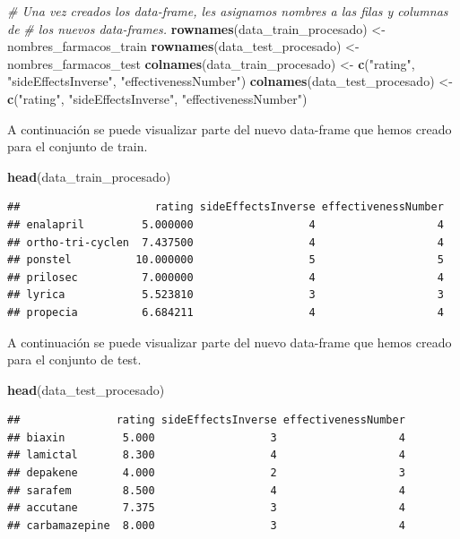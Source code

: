 \documentclass[spanish,]{article}
\newenvironment{Shaded}{\begin{snugshade}}{\end{snugshade}}
\newcommand{\KeywordTok}[1]{\textcolor[rgb]{0.13,0.29,0.53}{\textbf{#1}}}
\newcommand{\StringTok}[1]{\textcolor[rgb]{0.31,0.60,0.02}{#1}}
\newcommand{\CommentTok}[1]{\textcolor[rgb]{0.56,0.35,0.01}{\textit{#1}}}
\newcommand{\NormalTok}[1]{#1}
\begin{document}
\begin{Shaded}
\begin{Highlighting}[]
\CommentTok{# Una vez creados los data-frame, les asignamos nombres a las filas y columnas de }
\CommentTok{# los nuevos data-frames.}
\KeywordTok{rownames}\NormalTok{(data_train_procesado) <-}\StringTok{ }\NormalTok{nombres_farmacos_train}
\KeywordTok{rownames}\NormalTok{(data_test_procesado) <-}\StringTok{ }\NormalTok{nombres_farmacos_test}
\KeywordTok{colnames}\NormalTok{(data_train_procesado) <-}\StringTok{ }\KeywordTok{c}\NormalTok{(}\StringTok{"rating"}\NormalTok{, }\StringTok{"sideEffectsInverse"}\NormalTok{, }\StringTok{"effectivenessNumber"}\NormalTok{)}
\KeywordTok{colnames}\NormalTok{(data_test_procesado) <-}\StringTok{ }\KeywordTok{c}\NormalTok{(}\StringTok{"rating"}\NormalTok{, }\StringTok{"sideEffectsInverse"}\NormalTok{, }\StringTok{"effectivenessNumber"}\NormalTok{)}
\end{Highlighting}
\end{Shaded}

A continuación se puede visualizar parte del nuevo data-frame que hemos
creado para el conjunto de train.

\begin{Shaded}
\begin{Highlighting}[]
\KeywordTok{head}\NormalTok{(data_train_procesado)}
\end{Highlighting}
\end{Shaded}

\begin{verbatim}
##                     rating sideEffectsInverse effectivenessNumber
## enalapril         5.000000                  4                   4
## ortho-tri-cyclen  7.437500                  4                   4
## ponstel          10.000000                  5                   5
## prilosec          7.000000                  4                   4
## lyrica            5.523810                  3                   3
## propecia          6.684211                  4                   4
\end{verbatim}

A continuación se puede visualizar parte del nuevo data-frame que hemos
creado para el conjunto de test.

\begin{Shaded}
\begin{Highlighting}[]
\KeywordTok{head}\NormalTok{(data_test_procesado)}
\end{Highlighting}
\end{Shaded}

\begin{verbatim}
##               rating sideEffectsInverse effectivenessNumber
## biaxin         5.000                  3                   4
## lamictal       8.300                  4                   4
## depakene       4.000                  2                   3
## sarafem        8.500                  4                   4
## accutane       7.375                  3                   4
## carbamazepine  8.000                  3                   4
\end{verbatim}
\end{document}
